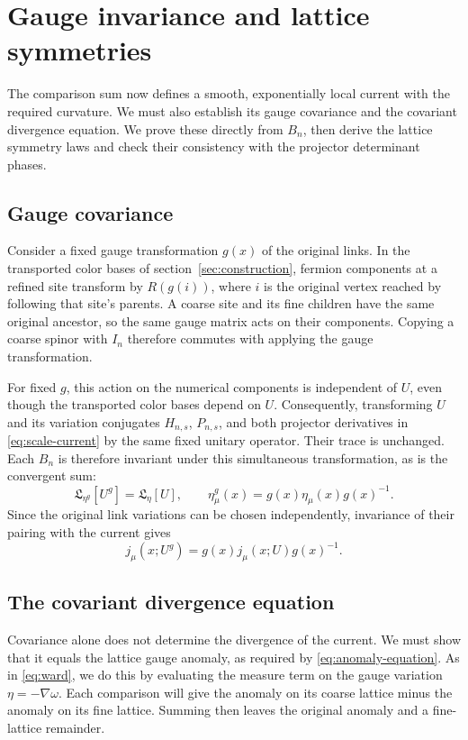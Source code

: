 \documentclass[11pt,a4paper]{article}
\theoremstyle{remark}
\begin{document}
\section{Gauge invariance and lattice symmetries}
\label{sec:symmetries}

The comparison sum now defines a smooth, exponentially local current
with the required curvature. We must also establish its gauge covariance
and the covariant divergence equation. We prove these directly from
$B_n$, then derive the lattice symmetry laws and check their consistency
with the projector determinant phases.

\subsection{Gauge covariance}

Consider a fixed gauge transformation $g(x)$ of the original links.
In the transported color bases of section~\ref{sec:construction},
fermion components at a refined site transform by $R(g(i))$, where
$i$ is the original vertex reached by following that site's parents.
A coarse site and its fine children have the same original ancestor,
so the same gauge matrix acts on their components. Copying a coarse
spinor with $I_n$ therefore commutes with applying the gauge transformation.

For fixed $g$, this action on the numerical components is independent
of $U$, even though the transported color bases depend on $U$.
Consequently, transforming $U$ and its variation conjugates
$H_{n,s}$, $P_{n,s}$, and both projector derivatives in
\eqref{eq:scale-current} by the same fixed unitary operator.
Their trace is unchanged. Each $B_n$ is therefore invariant under this
simultaneous transformation, as is the convergent sum:
\begin{equation}
 \mathfrak L_{\eta^g}[U^g]=\mathfrak L_\eta[U],\qquad
 \eta^g_\mu(x)=g(x)\eta_\mu(x)g(x)^{-1}.
\end{equation}
Since the original link variations can be chosen independently,
invariance of their pairing with the current gives
\begin{equation}
 j_\mu(x;U^g)=g(x)j_\mu(x;U)g(x)^{-1}.
\end{equation}

\subsection{The covariant divergence equation}

Covariance alone does not determine the divergence of the current.
We must show that it equals the lattice gauge anomaly, as required by
\eqref{eq:anomaly-equation}. As in \eqref{eq:ward}, we do this by
evaluating the measure term on the gauge variation $\eta=-\nabla\omega$.
Each comparison will give the anomaly on its coarse lattice minus the
anomaly on its fine lattice. Summing then leaves the original anomaly
and a fine-lattice remainder.
\end{document}
